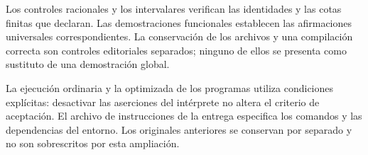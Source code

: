 Los controles racionales y los intervalares verifican las identidades y
las cotas finitas que declaran. Las demostraciones funcionales establecen
las afirmaciones universales correspondientes. La conservación de los
archivos y una compilación correcta son controles editoriales separados;
ninguno de ellos se presenta como sustituto de una demostración global.

La ejecución ordinaria y la optimizada de los programas utiliza condiciones
explícitas: desactivar las aserciones del intérprete no altera el criterio
de aceptación. El archivo de instrucciones de la entrega especifica los
comandos y las dependencias del entorno. Los originales anteriores se
conservan por separado y no son sobrescritos por esta ampliación.
\par\endgroup

